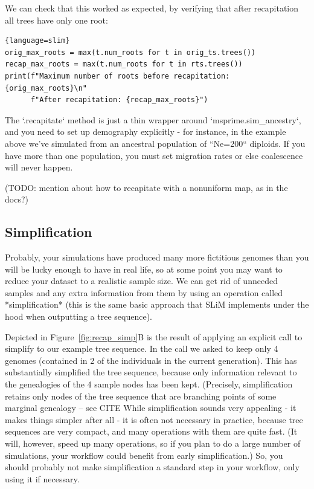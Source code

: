 \documentclass[12pt]{article}
\begin{document}
We can check that this worked as expected, by verifying that after recapitation
all trees have only one root:
\begin{lstlisting}{language=slim}
orig_max_roots = max(t.num_roots for t in orig_ts.trees())
recap_max_roots = max(t.num_roots for t in rts.trees())
print(f"Maximum number of roots before recapitation: {orig_max_roots}\n"
      f"After recapitation: {recap_max_roots}")
\end{lstlisting}

The `.recapitate` method
is just a thin wrapper around `msprime.sim\_ancestry`,
and you need to set up demography explicitly - for instance, in the example above
we've simulated from an ancestral population of ``Ne=200`` diploids.
If you have more than one population,
you must set migration rates or else coalescence will never happen.

(TODO: mention about how to recapitate with a nonuniform map, as in the docs?)


\subsection*{Simplification}


Probably, your simulations have produced many more fictitious genomes
than you will be lucky enough to have in real life,
so at some point you may want to reduce your dataset to a realistic sample size.
We can get rid of unneeded samples and any extra information from them by using
an operation called *simplification* (this is the same basic approach that SLiM
implements under the hood when outputting a tree sequence).

Depicted in Figure~\ref{fig:recap_simp}B is the result of applying an explicit call to
simplify to our example tree sequence.
In the call we asked to keep only 4
genomes (contained in 2 of the individuals in the current generation). This has
substantially simplified the tree sequence, because only information relevant to the
genealogies of the 4 sample nodes has been kept. (Precisely, simplification retains only
nodes of the tree sequence that are branching points of some marginal genealogy -- see
CITE %
While simplification sounds very appealing - it makes things simpler after all -
it is often not necessary in practice, because tree sequences are very compact,
and many operations with them are quite fast.
(It will, however, speed up many operations, so if you plan to do a large number of simulations,
your workflow could benefit from early simplification.)
So, you should probably not make simplification a standard step in your workflow,
only using it if necessary.
\end{document}
